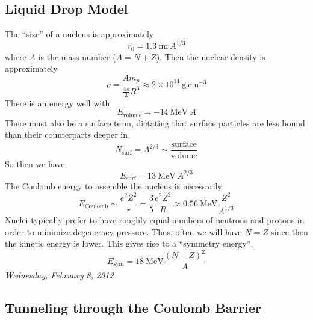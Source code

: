 \documentclass[10pt]{article}
\numberwithin{equation}{section}
\begin{document}
  \subsection{Liquid Drop Model}
  \label{sec:liquid-drop-model}

  The ``size'' of a nucleus is approximately
  \begin{equation}
    \label{eq:93}
    r_0=1.3\ \mathrm{fm}\ A^{1/3}
  \end{equation}
  where $A$ is the mass number ($A=N+Z$). Then the nuclear density is
  approximately
  \begin{equation}
    \label{eq:94}
    \rho=\frac{Am_p}{\frac{4\pi}{3}R^3}\approx2\times 10^{14}\ \mathrm{g\ cm^{-3}}
  \end{equation}
  There is an energy well with
  \begin{equation}
    \label{eq:95}
    E_{\mathrm{volume}}=-14\ \mathrm{MeV}\ A
  \end{equation}
  There must also be a surface term, dictating that surface particles
  are less bound than their counterparts deeper in
  \begin{equation}
    \label{eq:96}
    N_{\mathrm{surf}}=A^{2/3}\sim\frac{\mathrm{surface}}{\mathrm{volume}}
  \end{equation}
  So then we have
  \begin{equation}
    \label{eq:97}
    E_{\mathrm{surf}}=13\ \mathrm{MeV}\ A^{2/3}
  \end{equation}
  The Coulomb energy to assemble the nucleus is necessarily
  \begin{equation}
    \label{eq:98}
    E_{\mathrm{Coulomb}}\sim\frac{e^2Z^2}{r}=\frac{3}{5}\frac{e^2
      Z^2}{R}\approx 0.56\ \mathrm{MeV}\frac{Z^2}{A^{1/3}}
  \end{equation}
  Nuclei typically prefer to have roughly equal numbers of neutrons
  and protons in order to minimize degeneracy pressure. Thus, often we
  will have $N=Z$ since then the kinetic energy is lower. This gives
  rise to a ``symmetry energy'',
  \begin{equation}
    \label{eq:99}
    E_{\mathrm{sym}}=18\ \mathrm{MeV}\frac{(N-Z)^2}{A}
  \end{equation}
  \textit{Wednesday, February 8, 2012}
  \subsection{Tunneling through the Coulomb Barrier}
  \label{sec:tunn-thro-coul}
\end{document}
